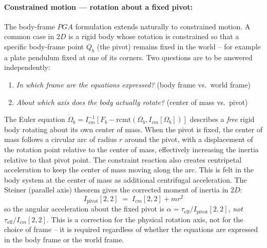 \paragraph{Constrained motion --- rotation about a fixed pivot:}
The body-frame $PGA$ formulation extends naturally to constrained motion. A common case in
$2D$ is a rigid body whose rotation is constrained so that a specific body-frame point
$Q_b$ (the pivot) remains fixed in the world -- for example a plate pendulum fixed at one
of its corners. Two questions are to be answered independently:
\begin{enumerate}
    \item \emph{In which frame are the equations expressed?} (body frame vs.\ world frame)
    \item \emph{About which axis does the body actually rotate?} (center of mass vs.\
    pivot)
\end{enumerate}
The Euler equation $\dot{\Omega}_b = I_{cm}^{-1}[F_b - \mathrm{rcmt}(\Omega_b,
I_{cm}[\Omega_b])]$ describes a \emph{free} rigid body rotating about its own center of
mass. When the pivot is fixed, the center of mass follows a circular arc of radius $r$
around the pivot, with a displacement of the rotation point relative to the center of
mass, effectively increasing the inertia relative to that pivot point. The constraint
reaction also creates centripetal acceleration to keep the center of mass moving along the
arc. This is felt in the body system at the center of mass as additional centrifugal
acceleration. The Steiner (parallel axis) theorem gives the corrected moment of inertia in
$2D$:
\begin{equation}
    I_\text{pivot}[2,2] \;=\; I_{cm}[2,2] + m r^2
    \label{eq:steiner_2d}
\end{equation}
so the angular acceleration about the fixed pivot is $\alpha = \tau_\text{eff} /
I_\text{pivot}[2,2]$, \emph{not} $\tau_\text{eff}/I_{cm}[2,2]$. This is a correction for
the physical rotation axis, not for the choice of frame -- it is required regardless of
whether the equations are expressed in the body frame or the world frame. \\

